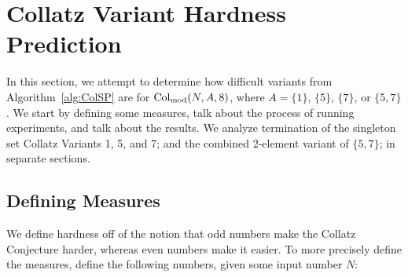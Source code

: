 \chapter{Collatz Variant Hardness Prediction} \label{sec:subhrdnspred}
In this section, we attempt to determine how difficult variants from Algorithm~\ref{alg:ColSP} are for $\mathrm{Col}_{\text{mod}}(N,A,8)$, where $A= \{1\}$, $\{5\}$, $\{7\}$, or $\{5,7\}$. We start by defining some measures, talk about the process of running experiments, and talk about the results. We analyze termination of the singleton set Collatz Variants 1, 5, and 7; and the combined 2-element variant of $\{5,7\}$; in separate sections. 
\section{Defining Measures} \label{subsec:algdefinemeasure} 
We define hardness off of the notion that odd numbers make the Collatz Conjecture harder, whereas even numbers make it easier. To more precisely define the measures, define the following numbers, given some input number $N$:
